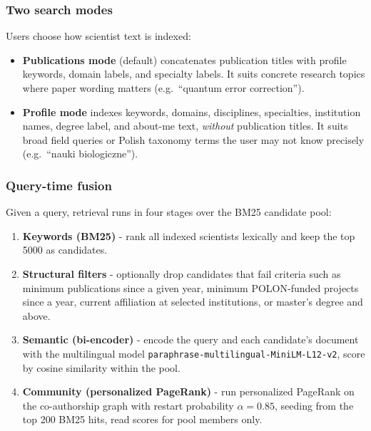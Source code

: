 \documentclass{article}
\begin{document}
\subsubsection{Two search modes}

Users choose how scientist text is indexed:
\begin{itemize}[noitemsep]
  \item \textbf{Publications mode} (default) concatenates publication titles with profile keywords, domain labels, and specialty labels. It suits concrete research topics where paper wording matters (e.g.\ ``quantum error correction'').
  \item \textbf{Profile mode} indexes keywords, domains, disciplines, specialties, institution names, degree label, and about-me text, \emph{without} publication titles. It suits broad field queries or Polish taxonomy terms the user may not know precisely (e.g.\ ``nauki biologiczne'').
\end{itemize}


\subsubsection{Query-time fusion}

Given a query, retrieval runs in four stages over the BM25 candidate pool:
\begin{enumerate}[noitemsep]
  \item \textbf{Keywords (BM25)} - rank all indexed scientists lexically and keep the top \num{5000} as candidates.
  \item \textbf{Structural filters} - optionally drop candidates that fail criteria such as minimum publications since a given year, minimum POLON-funded projects since a year, current affiliation at selected institutions, or master's degree and above.
  \item \textbf{Semantic (bi-encoder)} - encode the query and each candidate's document with the multilingual model \texttt{paraphrase-multilingual-MiniLM-L12-v2}, score by cosine similarity within the pool.
  \item \textbf{Community (personalized PageRank)} - run personalized PageRank on the co-authorship graph with restart probability $\alpha = 0.85$, seeding from the top \num{200} BM25 hits, read scores for pool members only.
\end{enumerate}
\end{document}
